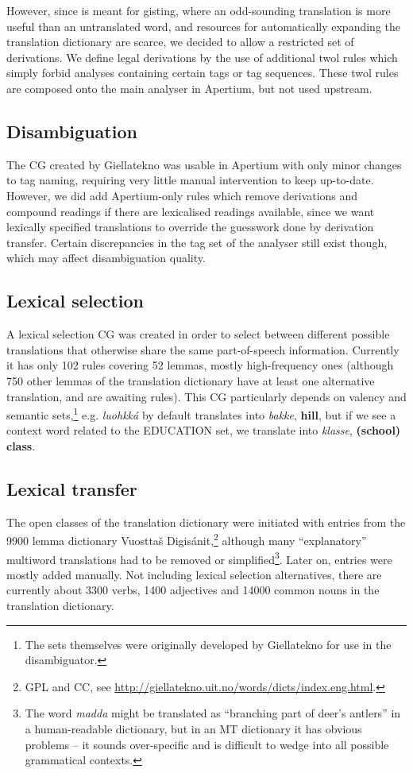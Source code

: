 \documentclass{book}
\begin{document}
However, since \smenob{} is meant for gisting, where an odd-sounding
translation is more useful than an untranslated word, and resources
for automatically expanding the translation dictionary are scarce, we
decided to allow a restricted set of derivations. We define legal
derivations by the use of additional twol rules which simply forbid
analyses containing certain tags or tag sequences. These twol rules
are composed onto the main analyser in Apertium, but not used
upstream.

\subsection{Disambiguation}
The CG created by Giellatekno was usable in Apertium with only minor
changes to tag naming, requiring very little manual intervention to
keep up-to-date. However, we did add Apertium-only rules which remove
derivations and compound readings if there are lexicalised readings
available, since we want lexically specified translations to override
the guesswork done by derivation transfer. Certain discrepancies in
the tag set of the analyser still exist though, which may affect
disambiguation quality.

\subsection{Lexical selection}
A lexical selection CG was created in order to select between
different possible translations that otherwise share the same
part-of-speech information. Currently it has only 102 rules covering
52 lemmas, mostly high-frequency ones (although 750 other lemmas of
the translation dictionary have at least one alternative translation,
and are awaiting rules). This CG particularly depends on valency and
semantic sets,\footnote{The sets themselves were originally developed
  by Giellatekno for use in the disambiguator.} e.g.
\textit{luohkk\'{a}} by default translates into \textit{bakke},
\textbf{hill}, but if we see a context word related to the
\textsc{EDUCATION} set, we translate into \textit{klasse},
\textbf{(school) class}.


\subsection{Lexical transfer}
The open classes of the translation dictionary were initiated with
entries from the 9900 lemma dictionary Vuostta\v{s}
Digis\'{a}nit,\footnote{GPL and CC, see
  \href{http://giellatekno.uit.no/words/dicts/index.eng.html}{http://giellatekno.uit.no/words/dicts/index.eng.html}.}
although many ``explanatory'' multiword translations had to be removed
or simplified\footnote{The word \textit{madda} might be translated as
  ``branching part of deer's antlers'' in a human-readable dictionary,
  but in an MT dictionary it has obvious problems -- it sounds
  over-specific and is difficult to wedge into all possible
  grammatical contexts.}. Later on, entries were mostly added
manually. Not including lexical selection alternatives, there are
currently about 3300 verbs, 1400 adjectives and 14000 common nouns in
the translation dictionary.
\end{document}
